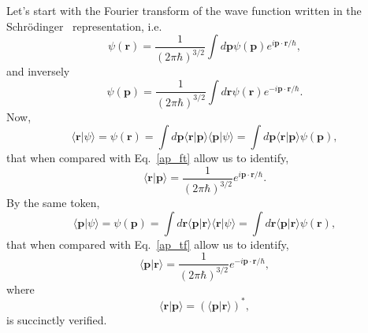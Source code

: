 Let's start with the Fourier transform of the wave function written in
the Schr\"odinger~ representation, i.e.
\begin{equation}\label{ap_ft}
\psi(\mathbf{r}) = \frac{1}{(2\pi\hbar)^{3/2}}\int d\mathbf{p} \psi(\mathbf{p})e^{i\mathbf{p}\cdot\mathbf{r}/\hbar}
,
\end{equation}  
and inversely 
\begin{equation}\label{ap_tf}
\psi(\mathbf{p}) = \frac{1}{(2\pi\hbar)^{3/2}}\int d\mathbf{r} \psi(\mathbf{r})
e^{-i\mathbf{p}\cdot\mathbf{r}/\hbar}
.
\end{equation}  
Now,
\begin{equation}\label{rpsi}
\langle\mathbf{r}\vert\psi\rangle=\psi(\mathbf{r})=\int d\mathbf{p} \langle\mathbf{r}\vert\mathbf{p}\rangle\langle\mathbf{p}\vert\psi\rangle=
\int d\mathbf{p} \langle\mathbf{r}\vert\mathbf{p}\rangle\psi(\mathbf{p})
,
\end{equation}
that when compared with Eq.~\eqref{ap_ft} allow us to identify,
\begin{equation}\label{rp2}
\langle\mathbf{r}\vert\mathbf{p}\rangle=\frac{1}{(2\pi\hbar)^{3/2}}e^{i\mathbf{p}\cdot\mathbf{r}/\hbar}
.
\end{equation}
By the same token,
\begin{equation}\label{rpsi2}
\langle\mathbf{p}\vert\psi\rangle=\psi(\mathbf{p})=\int d\mathbf{r} \langle\mathbf{p}\vert\mathbf{r}\rangle\langle\mathbf{r}\vert\psi\rangle=
\int d\mathbf{r} \langle\mathbf{p}\vert\mathbf{r}\rangle\psi(\mathbf{r})
,
\end{equation}
that when compared with Eq.~\eqref{ap_tf} allow us to identify,
\begin{equation}\label{rp}
\langle\mathbf{p}\vert\mathbf{r}\rangle=\frac{1}{(2\pi\hbar)^{3/2}}e^{-i\mathbf{p}\cdot\mathbf{r}/\hbar}
,
\end{equation}
where
\begin{equation}\label{ap_good}
\langle\mathbf{r}\vert\mathbf{p}\rangle=(\langle\mathbf{p}\vert\mathbf{r}\rangle)^*
,
\end{equation}
is succinctly verified.
 

